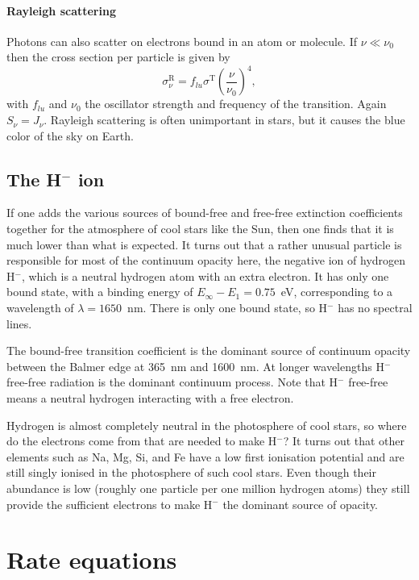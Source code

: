 \documentclass[12pt]{article}
\numberwithin{equation}{section}
\def\Jnu{\ensuremath{J_{\nu}}}
\def\Snu{\ensuremath{S_{\nu}}}
\newcommand{\be}{\begin{equation}}
\newcommand{\ee}{\end{equation}}
\begin{document}
\paragraph{Rayleigh scattering}
Photons can also scatter on electrons bound in an atom or molecule. If $\nu \ll \nu_0$ then the cross section per particle is given by
\be
 \sigma^\mathrm{R}_\nu = f_{lu} \sigma^\mathrm{T}  \left( \frac{\nu}{\nu_0} \right)^4,
\ee
with $f_{lu}$ and $\nu_0$ the oscillator strength and frequency of the transition. Again $\Snu=\Jnu$. Rayleigh scattering is often unimportant in stars, but it causes the blue color of the sky on Earth.

\subsection{The H$^-$ ion}
If one adds the various sources of bound-free and free-free extinction coefficients together for the atmosphere of cool stars like the Sun, then one finds that it is much lower than what is expected. It  turns out that a rather unusual particle is responsible for most of the continuum opacity here, the negative ion of hydrogen H$^-$, which is a neutral hydrogen atom with an extra electron. It has only one bound state, with a binding energy of $E_\infty-E_1 =0.75$~eV, corresponding to a wavelength of $\lambda=1650$~nm. There is only one bound state, so H$^-$ has no spectral lines. 

The bound-free transition coefficient is the dominant source of continuum opacity between the Balmer edge at 365~nm and 1600~nm. At longer wavelengths H$^-$ free-free radiation is the dominant continuum process.  Note that H$^-$ free-free means a neutral hydrogen interacting with a free electron. 

Hydrogen is almost completely neutral in the photosphere of cool stars, so where do the electrons come from that are needed to make H$^-$? It turns out that other elements such as Na, Mg, Si, and Fe have a low first ionisation potential and are still singly ionised in the photosphere of such cool stars. Even though their abundance is low (roughly one particle per one million hydrogen atoms) they still provide the sufficient electrons to make H$^-$ the dominant source of opacity.

\section{Rate equations}
\end{document}

